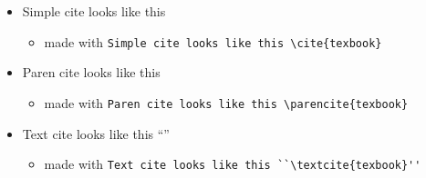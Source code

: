 \documentclass[12pt,a4paper,dvipsnames]{article}
\begin{document}
\begin{itemize}
\begin{itemize}
  \end{itemize}
\item Simple cite looks like this \cite{texbook}
  \begin{itemize}
  \item made with {\color{PineGreen}\tt{}\lstinline#Simple cite looks like this \cite{texbook}#} 
  \end{itemize}
\item Paren cite looks like this \parencite{texbook}
  \begin{itemize}
  \item made with {\color{PineGreen}\tt{}\lstinline#Paren cite looks like this \parencite{texbook}#} 
  \end{itemize}
\item Text cite looks like this ``\textcite{texbook}''
  \begin{itemize}
  \item made with {\color{PineGreen}\tt{}\lstinline#Text cite looks like this ``\textcite{texbook}''#} 
  \end{itemize}
\end{itemize}
\clearpage{}
\printbibliography
\end{document}
